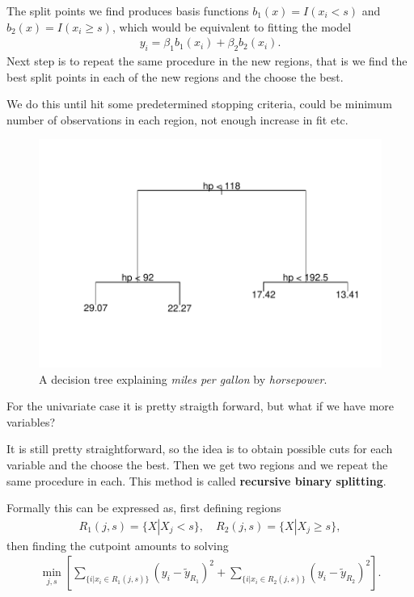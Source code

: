 \documentclass[aspectratio=169,10pt]{beamer}
\begin{document}
\begin{frame}{\secname}{\subsecname}
  The split points we find produces basis functions $b_1(x) = I(x_i < s)$ and $b_2(x) = I(x_i \geq s)$, which would be equivalent to fitting the model
  \begin{align}
      y_i = \beta_1 b_1 (x_i) + \beta_2 b_2 (x_i).
  \end{align}
  Next step is to repeat the same procedure in the new regions, that is we find the best split points in each of the new regions and the choose the best.

  We do this until hit some predetermined stopping criteria, could be minimum number of observations in each region, not enough increase in fit etc.
\end{frame}

\begin{frame}{\secname}{\subsecname}
  \begin{figure}
    \includegraphics[width=.6\textwidth]{scripts/output/uni-tree.pdf}
    \caption{A decision tree explaining \textit{miles per gallon} by \textit{horsepower}.}
  \end{figure}
\end{frame}

\begin{frame}{\secname}{\subsecname}
  For the univariate case it is pretty straigth forward, but what if we have more variables?

  It is still pretty straightforward, so the idea is to obtain possible cuts for each variable and the choose the best.
  Then we get two regions and we repeat the same procedure in each.
  This method is called \textbf{recursive binary splitting}.

  Formally this can be expressed as, first defining regions
  {\small\begin{align}
    R_1 (j,s) = \{ X | X_j < s \}, \quad
    R_2 (j,s) = \{X | X_j \geq s\},
  \end{align}}
  then finding the cutpoint amounts to solving
  {\small\begin{align}
    \min_{j,s} \left[ \sum_{ \{ i | x_i \in R_1 (j,s)\} } (y_i - \tilde{y}_{R_1})^2 + \sum_{\{ i | x_i \in R_2(j,s) \}} (y_i - \tilde{y}_{R_2})^2\right].
  \end{align}}
\end{frame}
\end{document}
